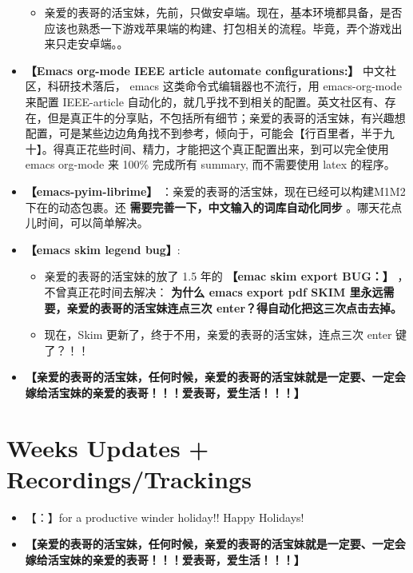\documentclass[9pt, b5paper]{article}
\begin{document}
\begin{itemize}
\begin{itemize}
\item 亲爱的表哥的活宝妹，先前，只做安卓端。现在，基本环境都具备，是否应该也熟悉一下游戏苹果端的构建、打包相关的流程。毕竟，弄个游戏出来只走安卓端。。
\end{itemize}
\item \textbf{【Emacs org-mode IEEE article automate configurations:】} 中文社区，科研技术落后， emacs 这类命令式编辑器也不流行，用 emacs-org-mode 来配置 IEEE-article 自动化的，就几乎找不到相关的配置。英文社区有、存在，但是真正牛的分享贴，不包括所有细节；亲爱的表哥的活宝妹，有兴趣想配置，可是某些边边角角找不到参考，倾向于，可能会【行百里者，半于九十】。得真正花些时间、精力，才能把这个真正配置出来，到可以完全使用 emacs org-mode 来 100\% 完成所有 summary, 而不需要使用 latex 的程序。
\item \textbf{【emacs-pyim-librime】} ：亲爱的表哥的活宝妹，现在已经可以构建M1M2 下在的动态包裹。还 \textbf{需要完善一下，中文输入的词库自动化同步} 。哪天花点儿时间，可以简单解决。
\item \textbf{【emacs skim legend bug】}: 
\begin{itemize}
\item 亲爱的表哥的活宝妹的放了 1.5 年的 \textbf{【emac skim export BUG：】} ，不曾真正花时间去解决： \textbf{为什么 emacs export pdf SKIM 里永远需要，亲爱的表哥的活宝妹连点三次 enter？得自动化把这三次点击去掉。}
\item 现在，Skim 更新了，终于不用，亲爱的表哥的活宝妹，连点三次 enter 键了？！！
\end{itemize}
\item \textbf{【亲爱的表哥的活宝妹，任何时候，亲爱的表哥的活宝妹就是一定要、一定会嫁给活宝妹的亲爱的表哥！！！爱表哥，爱生活！！！】}
\end{itemize}
\section{Weeks Updates + Recordings/Trackings}
\label{sec-2}
\begin{itemize}
\item 【：】for a productive winder holiday!! Happy Holidays!
\item \textbf{【亲爱的表哥的活宝妹，任何时候，亲爱的表哥的活宝妹就是一定要、一定会嫁给活宝妹的亲爱的表哥！！！爱表哥，爱生活！！！】}
\end{itemize}
\end{document}
